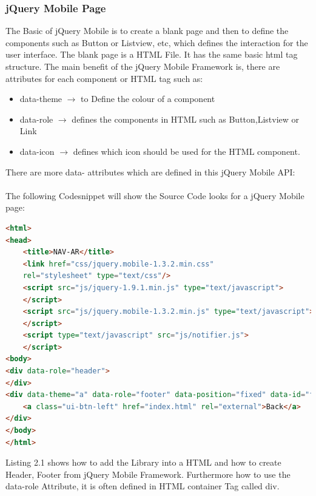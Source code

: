 \subsubsection{jQuery Mobile Page}
The Basic of jQuery Mobile is to create a blank page and then to define the components such as Button or Listview, etc, which defines the interaction for the user interface.  The blank page is a HTML File. It has the same basic html tag structure. The main benefit of the jQuery Mobile Framework is, there are attributes for each component or HTML tag such as:
\\
\begin{itemize}
\item data-theme $\rightarrow$ to Define the colour of a component
\item data-role $\rightarrow$ defines the components in HTML such as Button,Listview or Link
\item data-icon $\rightarrow$  defines which icon should be used for the HTML component.
\end{itemize}

There are more data- attributes which are defined in this jQuery Mobile API:  \href{http://demos.jquerymobile.com/1.2.0/docs/api/data-attributes.html}\\\\     
\newpage The following Codesnippet will show  the Source Code looks for a jQuery Mobile page:

\begin{lstlisting}[language=html,caption= jQuery Page,captionpos=b]
<html>
<head>
    <title>NAV-AR</title>
    <link href="css/jquery.mobile-1.3.2.min.css" 
    rel="stylesheet" type="text/css"/>
    <script src="js/jquery-1.9.1.min.js" type="text/javascript">
    </script>
    <script src="js/jquery.mobile-1.3.2.min.js" type="text/javascript">
    </script>
    <script type="text/javascript" src="js/notifier.js">
    </script>    
<body>
<div data-role="header">
</div>
<div data-theme="a" data-role="footer" data-position="fixed" data-id="footer">
    <a class="ui-btn-left" href="index.html" rel="external">Back</a>
</div>
</body>
</html>

\end{lstlisting}

Listing 2.1 shows how to add the Library into a HTML and how to create Header, Footer from jQuery Mobile Framework. Furthermore how to use the data-role Attribute, it is often defined in HTML container Tag called div.\\\\

